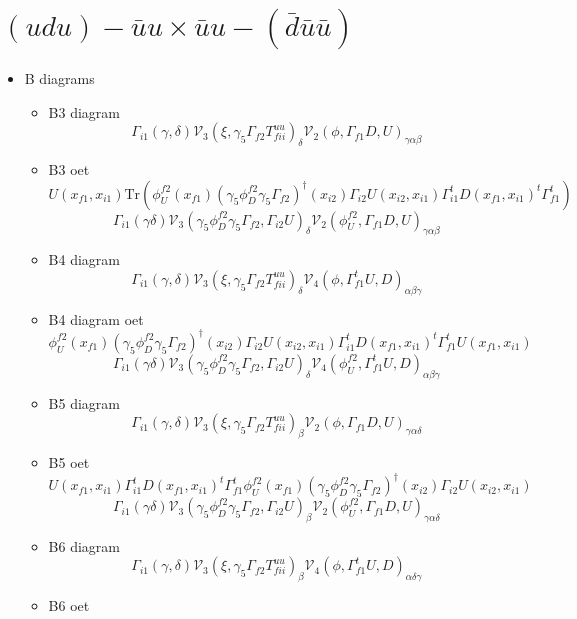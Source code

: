 \documentclass{article}[12pt]
\begin{document}
\section{$(udu)-\bar{u}u \times \bar{u}u-(\bar{d}\bar{u}\bar{u}) $}
\begin{itemize}
\item B diagrams
\begin{itemize}
\item B3 diagram
$$
\Gamma_{i1}\left(\gamma,\delta\right){\mathcal V}_3\left(\xi,\gamma_5\Gamma_{f2}T^{uu}_{fii}\right)_{\delta}
{\mathcal V}_2\left(\phi,\Gamma_{f1}D,U\right)_{\gamma\alpha\beta}
$$
\item B3 oet
$$
U(x_{f1},x_{i1})\mathrm{Tr}(\phi_U^{f2}(x_{f1})(\gamma_5\phi_D^{f2}\gamma_5\Gamma_{f2})^{\dagger}(x_{i2})\Gamma_{i2}U(x_{i2},x_{i1})\Gamma_{i1}^tD(x_{f1},x_{i1})^t\Gamma_{f1}^t)
$$
$$
\Gamma_{i1}(\gamma\delta){\mathcal V}_3(\gamma_5\phi_D^{f2}\gamma_5\Gamma_{f2},\Gamma_{i2}U)_{\delta}{\mathcal V}_2(\phi_U^{f2},\Gamma_{f1}D,U)_{\gamma\alpha\beta}
$$
\item B4 diagram
$$
\Gamma_{i1}\left(\gamma,\delta\right){\mathcal V}_3\left(\xi,\gamma_5\Gamma_{f2}T^{uu}_{fii}\right)_{\delta}
{\mathcal V}_4\left(\phi,\Gamma_{f1}^tU,D\right)_{\alpha\beta\gamma}
$$
\item B4 diagram oet
$$
\phi_U^{f2}(x_{f1})(\gamma_5\phi_D^{f2}\gamma_5\Gamma_{f2})^{\dagger}(x_{i2})\Gamma_{i2}U(x_{i2},x_{i1})\Gamma_{i1}^tD(x_{f1},x_{i1})^t\Gamma_{f1}^tU(x_{f1},x_{i1})
$$
$$
\Gamma_{i1}(\gamma\delta){\mathcal V}_3(\gamma_5\phi_D^{f2}\gamma_5\Gamma_{f2},\Gamma_{i2}U)_{\delta}{\mathcal V}_4(\phi_U^{f2},\Gamma_{f1}^tU,D)_{\alpha\beta\gamma}
$$
\item B5 diagram
$$
\Gamma_{i1}\left(\gamma,\delta\right){\mathcal V}_3\left(\xi,\gamma_5\Gamma_{f2}T^{uu}_{fii}\right)_{\beta}
{\mathcal V}_2\left(\phi,\Gamma_{f1}D,U\right)_{\gamma\alpha\delta}
$$
\item B5 oet 
$$
U(x_{f1},x_{i1})\Gamma_{i1}^tD(x_{f1},x_{i1})^t\Gamma_{f1}^t\phi_U^{f2}(x_{f1})(\gamma_5\phi_D^{f2}\gamma_5\Gamma_{f2})^{\dagger}(x_{i2})\Gamma_{i2}U(x_{i2},x_{i1})
$$
$$
\Gamma_{i1}\left(\gamma\delta\right){\mathcal V}_3\left(\gamma_5\phi_D^{f2}\gamma_5\Gamma_{f2},\Gamma_{i2}U\right)_{\beta}
{\mathcal V}_2\left(\phi_U^{f2},\Gamma_{f1}D,U\right)_{\gamma\alpha\delta}
$$
\item B6 diagram
$$
\Gamma_{i1}\left(\gamma,\delta\right){\mathcal V}_3\left(\xi,\gamma_5\Gamma_{f2}T^{uu}_{fii}\right)_{\beta}
{\mathcal V}_4\left(\phi,\Gamma_{f1}^tU,D\right)_{\alpha\delta\gamma}
$$
\item B6 oet

\end{itemize}
\end{itemize}
\end{document}
